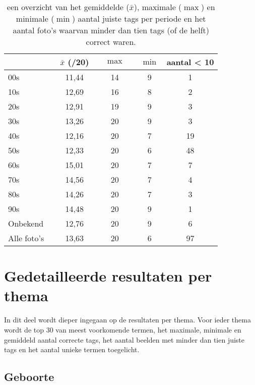\begin{table}
    \renewcommand\arraystretch{1.2}
    \centering
	\begin{tabular}{ll|cccccc}
		\toprule
		& &$\bar{x}$ (/20)&&  $\max$ && $\min$ &  aantal < 10 \\ 
		\midrule
		00s && 11,44 && 14 && 9 & 1 \\ 
		10s & &12,69 && 16 && 8 &  2 \\ 
		20s & &12,91 && 19 && 9 & 3 \\ 
		30s & &13,26 && 20 && 9 & 3 \\ 
		40s & &12,16 && 20 && 7 & 19 \\ 
		50s & &12,33 && 20 && 6 & 48 \\ 
		60s & &15,01 && 20 && 7 & 7 \\ 
		70s & &14,56 && 20 && 7 & 4 \\ 
		80s & &14,26 && 20 && 7 & 3 \\ 
		90s & &14,48 && 20 && 9 & 1 \\ 
		Onbekend && 12,76 && 20 && 9  & 6 \\ 
        \midrule
		Alle foto's && 13,63 && 20 && 6  & 97 \\ 
		\bottomrule
	\end{tabular} 
	\caption[een overzicht van de resultaten per periode na gebruik van het ingebouwde model]{een overzicht van het gemiddelde ($\bar{x}$), maximale ($\max$) en minimale ($\min$) aantal juiste tags per periode en het aantal foto’s waarvan minder dan tien tags (of de helft) correct waren. }
	\label{tab:analyse-resultaten-periode}
\end{table}

\section{Gedetailleerde resultaten per thema}
\label{sec:gedetailleerde-resultaten-per-thema}

In dit deel wordt dieper ingegaan op de resultaten per thema. Voor ieder thema wordt de top 30 van meest voorkomende termen, het maximale, minimale en gemiddeld aantal correcte tags, het aantal beelden met minder dan tien juiste tags en het aantal unieke termen toegelicht. 

\subsection{Geboorte}

